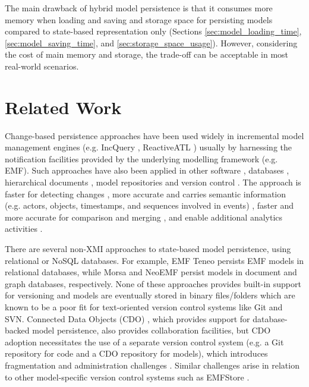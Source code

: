 \documentclass{llncs}
\begin{document}
The main drawback of hybrid model persistence is that it consumes more memory when loading and saving and storage space for persisting models compared to state-based representation only (Sections \ref{sec:model_loading_time}, \ref{sec:model_saving_time}, and \ref{sec:storage_space_usage}). However, considering the cost of main memory and storage, the trade-off can be acceptable in most real-world scenarios.

\section{Related Work}
\label{sec:related_work}
Change-based persistence approaches have been used widely in incremental model management engines (e.g. IncQuery \cite{DBLP:conf/ecmdafa/RathHV12}, ReactiveATL \cite{DBLP:conf/ecmdafa/OgunyomiRK15}) usually by harnessing the notification facilities provided by the underlying modelling framework (e.g. EMF). Such approaches have also been applied in other software \cite{DBLP:journals/entcs/RobbesL07}, databases \cite{DBLP:conf/sde/LippeO92}, hierarchical documents \cite{DBLP:conf/caise/IgnatN05}, model repositories and version control \cite{koegel2010emfstore}. The approach is faster for detecting changes \cite{DBLP:conf/edoc/KoegelHLHD10}, more accurate and carries semantic information (e.g. actors, objects, timestamps, and sequences involved in events) \cite{DBLP:journals/entcs/RobbesL07,DBLP:conf/sde/LippeO92,DBLP:conf/caise/IgnatN05,mens2002state}, faster and more accurate for comparison and merging \cite{DBLP:conf/sde/LippeO92,DBLP:conf/caise/IgnatN05,koegel2010emfstore}, and enable additional analytics activities \cite{DBLP:journals/entcs/RobbesL07}.

There are several non-XMI approaches to state-based model persistence, using relational or NoSQL databases. For example, EMF Teneo \cite{eclipse2017teneo} persists EMF models in relational databases, while Morsa \cite{DBLP:conf/models/Espinazo-PaganCM11} and NeoEMF \cite{daniel2016neoemf} persist models in document and graph databases, respectively. None of these approaches provides built-in support for versioning and models are eventually stored in binary files/folders which are known to be a poor fit for text-oriented version control systems like Git and SVN. Connected Data Objects (CDO) \cite{eclipse2017cdo}, which provides support for database-backed model persistence, also provides collaboration facilities, but CDO adoption necessitates the use of a separate version control system (e.g. a Git repository for code and a CDO repository for models), which introduces fragmentation and administration challenges \cite{barmpis2014evaluation}. Similar challenges arise in relation to other model-specific version control systems such as EMFStore \cite{koegel2010emfstore}. %
\end{document}
